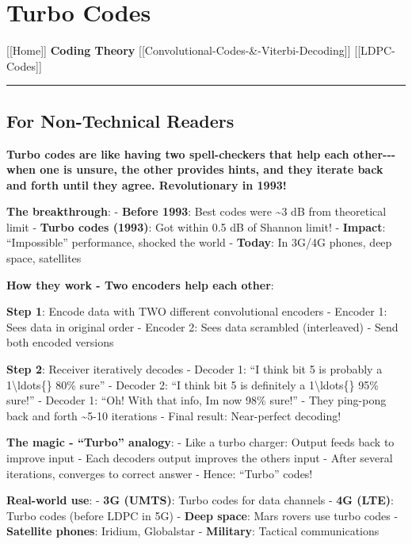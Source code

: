 \section{Turbo Codes}\label{turbo-codes}

{[}{[}Home{]}{]} \textbar{} \textbf{Coding Theory} \textbar{}
{[}{[}Convolutional-Codes-\&-Viterbi-Decoding{]}{]} \textbar{}
{[}{[}LDPC-Codes{]}{]}

\begin{center}\rule{0.5\linewidth}{0.5pt}\end{center}

\subsection{\texorpdfstring{ For Non-Technical
Readers}{ For Non-Technical Readers}}\label{for-non-technical-readers}

\textbf{Turbo codes are like having two spell-checkers that help each
other-\/-\/-when one is unsure, the other provides hints, and they
iterate back and forth until they agree. Revolutionary in 1993!}

\textbf{The breakthrough}: - \textbf{Before 1993}: Best codes were
\textasciitilde3 dB from theoretical limit - \textbf{Turbo codes
(1993)}: Got within 0.5 dB of Shannon limit! - \textbf{Impact}:
``Impossible'' performance, shocked the world - \textbf{Today}: In 3G/4G
phones, deep space, satellites

\textbf{How they work - Two encoders help each other}:

\textbf{Step 1}: Encode data with TWO different convolutional encoders -
Encoder 1: Sees data in original order - Encoder 2: Sees data scrambled
(interleaved) - Send both encoded versions

\textbf{Step 2}: Receiver iteratively decodes - Decoder 1: ``I think bit
5 is probably a 1\textbackslash ldots\{\} 80\% sure'' - Decoder 2: ``I
think bit 5 is definitely a 1\textbackslash ldots\{\} 95\% sure!'' -
Decoder 1: ``Oh! With that info, I\textquotesingle m now 98\% sure!'' -
They ping-pong back and forth \textasciitilde5-10 iterations - Final
result: Near-perfect decoding!

\textbf{The magic - ``Turbo'' analogy}: - Like a turbo charger: Output
feeds back to improve input - Each decoder\textquotesingle s output
improves the other\textquotesingle s input - After several iterations,
converges to correct answer - Hence: ``Turbo'' codes!

\textbf{Real-world use}: - \textbf{3G (UMTS)}: Turbo codes for data
channels - \textbf{4G (LTE)}: Turbo codes (before LDPC in 5G) -
\textbf{Deep space}: Mars rovers use turbo codes - \textbf{Satellite
phones}: Iridium, Globalstar - \textbf{Military}: Tactical
communications

